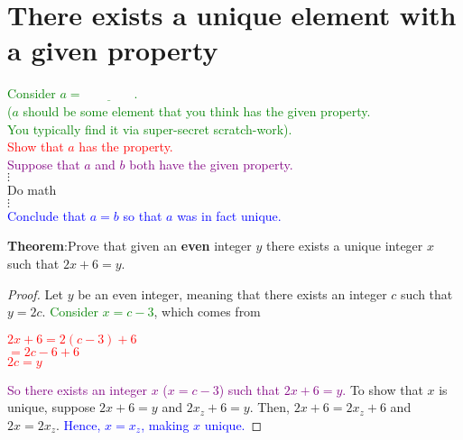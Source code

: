 \documentclass[11pt, oneside]{article}
\begin{document}
 
 
		   \newpage
   
   \section{There exists a unique element with a given property}
   
   		\begin{center}
 		  \textcolor{green}{Consider $a= \underline{\qquad \qquad}$. \\
 		  ($a$ should be some element that you think has the given property.  \\ You typically find it via super-secret scratch-work).}\\[0.2in] 
 		  \textcolor{red}{Show that $a$ has the property.}\\[0.2in] 
  		 \textcolor{purple}{Suppose that $a$ and $b$ both have the given property.}\\
  		  $\vdots$ \\ Do math \\ $\vdots$ \\
  		  \textcolor{blue}{Conclude that $a=b$ so that $a$ was in fact unique.}\\[0.2in] 
		  \end{center} 
		  
\noindent \textbf{Theorem}:Prove that given an \textbf{even} integer $y$ there exists a unique integer $x$ such that $2x+6=y$.
\begin{proof}
Let $y$ be an even integer, meaning that there exists an integer $c$ such that $y=2c$. 
\textcolor{green}{Consider $x=c-3$}, which comes from
\begin{center}
   \textcolor{red}{ $2x+6=2(c-3)+6$\\
    $=2c-6+6$\\
    $2c=y$}
\end{center}
\textcolor{purple}{So there exists an integer $x$ ($x=c-3$) such that $2x+6=y$.} To show that $x$ is unique, suppose $2x+6=y$ and $2x_{z}+6=y$. Then, $2x+6=2x_{z}+6$ and $2x=2x_{z}$.
\textcolor{blue}{Hence, $x=x_{z}$, making $x$ unique.}
\end{proof}



         
   	   \newpage
\end{document}
